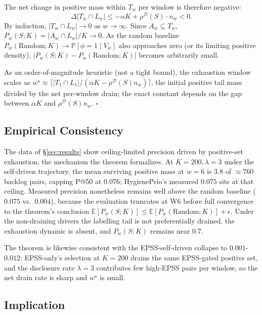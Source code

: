 The net change in positive mass within $T_w$ per window is therefore
negative:
\begin{equation}
\Delta |T_w \cap L_w| \leq -\alpha K + \rho^{\mathcal{D}}(S) \cdot n_w < 0.
\end{equation}
By induction, $|T_w \cap L_w| \to 0$ as $w \to \infty$. Since $A_w
\subseteq T_w$, $P_w(S; K) = |A_w \cap L_w| / K \to 0$. As the random
baseline $P_w(\mathrm{Random}; K) \to \mathbb{P}[\phi = 1 \mid V_w]$
also approaches zero (or its limiting positive density),
$|P_w(S; K) - P_w(\mathrm{Random}; K)|$ becomes arbitrarily small.

As an order-of-magnitude heuristic (not a tight bound), the
exhaustion window scales as
$w^\star \approx \lceil |T_1 \cap L_1| / (\alpha K -
\rho^{\mathcal{D}}(S) n_w) \rceil$, the initial positive tail mass
divided by the net per-window drain; the exact constant depends on
the gap between $\alpha K$ and $\rho^{\mathcal{D}}(S) n_w$.
\hfill$\square$

\subsection{Empirical Consistency}

The data of \S\ref{sec:results} show ceiling-limited precision driven
by positive-set exhaustion, the mechanism the theorem formalizes.
At $K = 200, \lambda = 3$ under the self-driven trajectory, the mean
surviving positive mass at $w = 6$ is $3.8$ of $\approx 760$ backlog
pairs, capping P@50 at $0.076$; HygienePrio's measured $0.075$ sits
at that ceiling. Measured precision nonetheless remains well above
the random baseline ($0.075$ vs.\ $0.004$), because the evaluation
truncates at W6 before full convergence to the theorem's conclusion
$\mathbb{E}[P_w(S;K)] \leq \mathbb{E}[P_w(\mathrm{Random};K)] +
\epsilon$. Under the non-draining drivers the labelling tail is not
preferentially drained, the exhaustion dynamic is absent, and
$P_w(S; K)$ remains near $0.7$.

The theorem is likewise consistent with the EPSS-self-driven collapse
to $0.001$-$0.012$: EPSS-only's selection at $K = 200$ drains the
same EPSS-gated positive set, and the disclosure rate $\lambda = 3$
contributes few high-EPSS pairs per window, so the net drain rate is
sharp and $w^\star$ is small.

\subsection{Implication}

